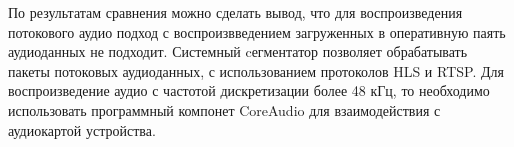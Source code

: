 		\par По результатам сравнения можно сделать вывод, что для воспроизведения потокового аудио подход с воспроизвведением загруженных в оперативную паять аудиоданных не подходит.
		Системный cегментатор позволяет обрабатывать пакеты потоковых аудиоданных, с использованием протоколов HLS и RTSP.
		Для воспроизведение аудио с частотой дискретизации более 48 кГц, то необходимо использовать программный компонет CoreAudio для взаимодействия с аудиокартой устройства.


\pagebreak



